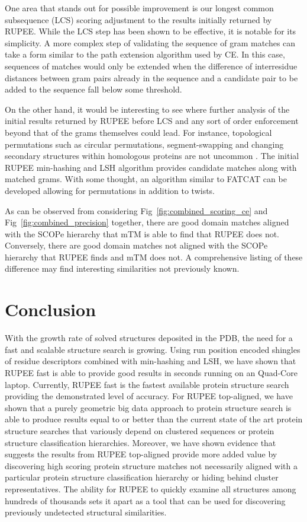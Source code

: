 \documentclass[10pt,letterpaper]{article}
\renewcommand{\figurename}{Fig}
\begin{document}
One area that stands out for possible improvement is our longest common subsequence (LCS) scoring adjustment to the results initially returned by RUPEE. 
While the LCS step has been shown to be effective, it is notable for its simplicity. 
A more complex step of validating the sequence of gram matches can take a form similar to the path extension algorithm used by CE. 
In this case, sequences of matches would only be extended when the difference of interresidue distances between gram pairs already in the sequence and a candidate pair to be added to the sequence fall below some threshold.

On the other hand, it would be interesting to see where further analysis of the initial results returned by RUPEE before LCS and any sort of order enforcement beyond that of the grams themselves could lead. 
For instance, topological permutations such as circular permutations, segment-swapping and changing secondary structures within homologous proteins are not uncommon \cite{Andreeva2007}. 
The initial RUPEE min-hashing and LSH algorithm provides candidate matches along with matched grams. 
With some thought, an algorithm similar to FATCAT can be developed allowing for permutations in addition to twists. 

As can be observed from considering \figurename~\ref{fig:combined_scoring_ce} and \figurename~\ref{fig:combined_precision} together, there are good domain matches aligned with the SCOPe hierarchy that mTM is able to find that RUPEE does not. 
Conversely, there are good domain matches not aligned with the SCOPe hierarchy that RUPEE finds and mTM does not. 
A comprehensive listing of these difference may find interesting similarities not previously known. 

\section*{Conclusion}

With the growth rate of solved structures deposited in the PDB, the need for a fast and scalable structure search is growing. 
Using run position encoded shingles of residue descriptors combined with min-hashing and LSH, we have shown that RUPEE fast is able to provide good results in seconds running on an Quad-Core laptop.
Currently, RUPEE fast is the fastest available protein structure search providing the demonstrated level of accuracy. 
For RUPEE top-aligned, we have shown that a purely geometric big data approach to protein structure search is able to produce results equal to or better than the current state of the art protein structure searches that variously depend on clustered sequences or protein structure classification hierarchies. 
Moreover, we have shown evidence that suggests the results from RUPEE top-aligned provide more added value by discovering high scoring protein structure matches not necessarily aligned with a particular protein structure classification hierarchy or hiding behind cluster representatives. 
The ability for RUPEE to quickly examine all structures among hundreds of thousands sets it apart as a tool that can be used for discovering previously undetected structural similarities.
\end{document}
